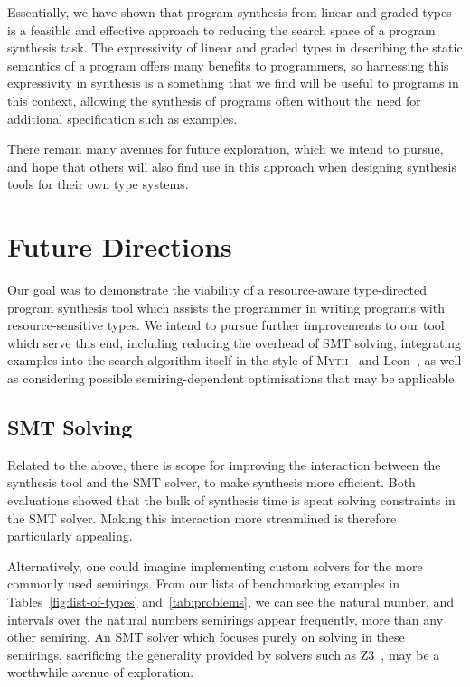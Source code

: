 Essentially, we have shown that program synthesis from linear and graded types
is a feasible and effective approach to reducing the search space of a program
synthesis task. The expressivity of linear and graded types in describing the
static semantics of a program offers many benefits to programmers, so
harnessing this expressivity in synthesis is a something that we find will be
useful to programs in this context, allowing the synthesis of programs often
without the need for additional specification such as examples.

There remain many avenues for future exploration, which we intend to pursue, and
hope that others will also find use in this approach when designing synthesis
tools for their own type systems. 

\section{Future Directions}
\label{section:future}

Our goal was to demonstrate the viability of a resource-aware type-directed
program synthesis tool which assists the programmer in writing
programs with resource-sensitive types. We intend to pursue further improvements
to our tool which serve this end, including reducing the overhead of SMT
solving, integrating examples into the search algorithm itself in the style of
\textsc{Myth}~\citep{oseraMYTH1} and Leon~\citep{10.1145/2509136.2509555}, as
well as considering possible semiring-dependent optimisations that may be
applicable.


\subsection{SMT Solving}
Related to the above, there is scope for improving the interaction between the
synthesis tool and the SMT solver, to make synthesis more efficient. Both
evaluations showed that the bulk of synthesis time is spent solving constraints
in the SMT solver. Making this interaction more streamlined is therefore
particularly appealing. 

Alternatively, one could imagine implementing custom solvers for the more
commonly used semirings. From our lists of benchmarking examples in
Tables~\ref{fig:list-of-types} and~\ref{tab:problems}, we can see the natural
number, and intervals over the natural numbers semirings appear frequently, more
than any other semiring. An SMT solver which focuses purely on solving in these
semirings, sacrificing the generality provided by solvers such as Z3~\citep{z3},
may be a worthwhile avenue of exploration. 


